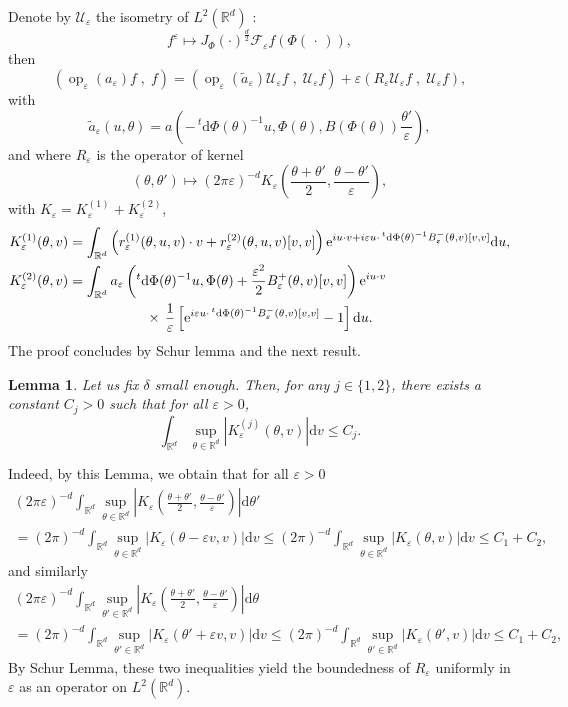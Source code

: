 \documentclass[10pt]{amsart}
\newtheorem{lemm}[cdrthm]{Lemma}
\theoremstyle{definition}
\DeclareMathOperator{\op}{op}
\newcommand*\R{{\mathbb R}}
\newcommand*\eps{\varepsilon}
\numberwithin{equation}{section}
\newcommand{\ee}{{\mathrm e}}
\newcommand*{\dd}{\mathrm{d}}
\newcommand*{\dv}{\dd v}
\newcommand*{\du}{\dd u}
\newcommand*{\dtheta}{\dd \theta}
\newcommand*{\dPhi}{\dd \Phi} %
\begin{document}

Denote by ${\mathcal U}_\eps$ the isometry of $L^2(\R^d)$ :
\[
f^\eps \mapsto J_\Phi(\cdot)^\frac{d}{2} {\mathcal F}_\eps f\left(\Phi\left(\,\cdot\, \right)\right),
\]
then
\[
\left(\op_\eps(a_\eps)f\;,\;f\right) = \left(\op_\eps \left(\widetilde a_\eps \right) {\mathcal U}_\eps f\;,\;{\mathcal U}_\eps f\right)+\eps\left(R_\eps {\mathcal U}_\eps f\;,\;{\mathcal U}_\eps f\right),
\]
with
\[
\widetilde a_\eps (u,\theta)= a\left(-\,^t \dPhi (\theta)^{-1} u,\Phi(\theta),B\left(\Phi(\theta)\right) \frac{\theta'}{\eps}\right),
\]
and where $R_\eps$ is the operator of kernel
\[
(\theta,\theta')\mapsto (2\pi\eps)^{-d} K_\eps \left(\frac{\theta+\theta'}{2},\frac{\theta-\theta'}{\eps}\right),
\]
with $K_\eps=K_\eps^{(1)}+K_\eps^{(2)}$,
\begin{align*}
K_\eps^{(1)}(\theta,v)&= \int_{\R^{d}} \left(r_\eps^{(1)}(\theta, u, v)\cdot v+ r_\eps^{(2)}(\theta,u,v) [v,v]\right){\ee}^{i u\cdot v +i\eps u\cdot \,^t \dPhi (\theta)^{-1} B_\eps^-(\theta,v)[v,v]} \du,\\
K_\eps^{(2)}(\theta,v) &= \int_{\R^{d}} a_\eps\left(^t \dPhi (\theta)^{-1} u,\Phi(\theta)+\frac{\eps^2}{2} B_\eps^+(\theta,v)[v,v]\right) {\ee}^{i u\cdot v} \\
&\mkern 100mu \times \,\frac{1}{\eps} \left[{\ee}^{i\eps u\cdot \,^t \dPhi (\theta)^{-1} B_\eps^-(\theta,v)[v,v]}-1 \right] \du.
\end{align*}
The proof concludes by Schur lemma and the next result.

\begin{lemm}\label{lem:estrest}
Let us fix $\delta$ small enough. Then, for any $j\in\{1,2\}$, there exists a constant $C_j>0$ such that for all $\eps>0$,
\[
\int_{\R^d} \sup_{\theta\in\R^d} |K_\eps^{(j)}(\theta,v) |\dv\leq C_j.
\]
\end{lemm}

Indeed, by this Lemma, we obtain that for all $\eps>0$
\begin{multline*}
(2\pi\eps)^{-d}\int_{\R^d} \sup_{\theta\in\R^d} \left|K_\eps \left(\frac{\theta+\theta'}{2},\frac{\theta-\theta'}{\eps}\right)\right|\dtheta'\\
= (2\pi)^{-d}\int_{\R^d} \sup_{\theta\in\R^d} |K_\eps \left(\theta-\eps v,v\right)|\dv \leq (2\pi)^{-d}\int_{\R^d} \sup_{\theta\in\R^d} |K_\eps \left(\theta,v\right)|\dv
\leq C_1+C_2,
\end{multline*}
and similarly
\begin{multline*}
(2\pi\eps)^{-d}\int_{\R^d} \sup_{\theta'\in\R^d} \left|K_\eps \left(\frac{\theta+\theta'}{2},\frac{\theta-\theta'}{\eps}\right)\right|\dtheta
\\
= (2\pi)^{-d}\int_{\R^d} \sup_{\theta'\in\R^d} |K_\eps \left(\theta'+\eps v,v\right)|\dv
\leq (2\pi)^{-d}\int_{\R^d} \sup_{\theta'\in\R^d} |K_\eps \left(\theta',v\right)|\dv
\leq C_1+C_2,
\end{multline*}
By Schur Lemma, these two inequalities yield the boundedness of $R_\eps$ uniformly in $\eps$ as an operator on $L^2(\R^d)$.
\end{document}
